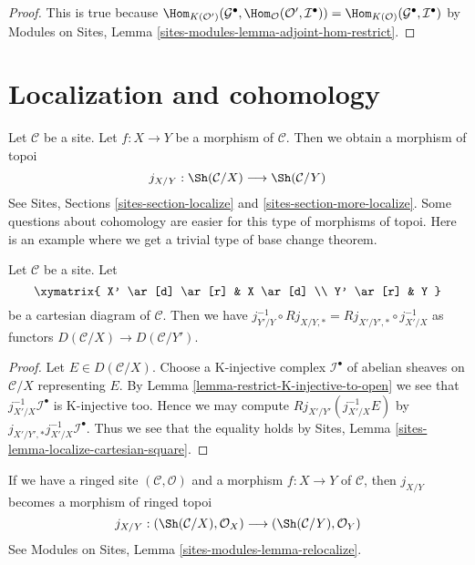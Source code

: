 \begin{proof}
This is true because
$\Hom_{K(\mathcal{O}')}(\mathcal{G}^\bullet,
\Hom_\mathcal{O}(\mathcal{O}', \mathcal{I}^\bullet)) =
\Hom_{K(\mathcal{O})}(\mathcal{G}^\bullet, \mathcal{I}^\bullet)$
by Modules on Sites, Lemma \ref{sites-modules-lemma-adjoint-hom-restrict}.
\end{proof}






\section{Localization and cohomology}
\label{section-localization}

\noindent
Let $\mathcal{C}$ be a site. Let $f : X \to Y$ be a morphism of $\mathcal{C}$.
Then we obtain a morphism of topoi
$$
j_{X/Y} : \Sh(\mathcal{C}/X) \longrightarrow \Sh(\mathcal{C}/Y)
$$
See Sites, Sections \ref{sites-section-localize} and
\ref{sites-section-more-localize}. Some questions about
cohomology are easier for this type of morphisms of topoi.
Here is an example where we get a trivial type of base change theorem.

\begin{lemma}
\label{lemma-localize-cartesian-square}
Let $\mathcal{C}$ be a site. Let
$$
\xymatrix{
X' \ar[d] \ar[r] & X \ar[d] \\
Y' \ar[r] & Y
}
$$
be a cartesian diagram of $\mathcal{C}$. Then we have
$j_{Y'/Y}^{-1} \circ Rj_{X/Y, *} = Rj_{X'/Y', *} \circ j_{X'/X}^{-1}$
as functors $D(\mathcal{C}/X) \to D(\mathcal{C}/Y')$.
\end{lemma}

\begin{proof}
Let $E \in D(\mathcal{C}/X)$. Choose a K-injective complex
$\mathcal{I}^\bullet$ of abelian sheaves on $\mathcal{C}/X$
representing $E$. By Lemma \ref{lemma-restrict-K-injective-to-open}
we see that $j_{X'/X}^{-1}\mathcal{I}^\bullet$ is K-injective too.
Hence we may compute $Rj_{X'/Y'}(j_{X'/X}^{-1}E)$ by
$j_{X'/Y', *}j_{X'/X}^{-1}\mathcal{I}^\bullet$.
Thus we see that the equality holds by
Sites, Lemma \ref{sites-lemma-localize-cartesian-square}.
\end{proof}

\noindent
If we have a ringed site $(\mathcal{C}, \mathcal{O})$
and a morphism $f : X \to Y$ of $\mathcal{C}$, then $j_{X/Y}$
becomes a morphism of ringed topoi
$$
j_{X/Y} :
(\Sh(\mathcal{C}/X), \mathcal{O}_X)
\longrightarrow
(\Sh(\mathcal{C}/Y), \mathcal{O}_Y)
$$
See Modules on Sites, Lemma \ref{sites-modules-lemma-relocalize}.

